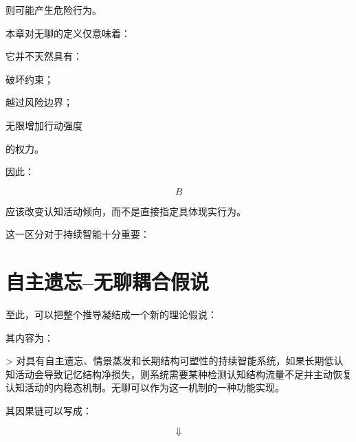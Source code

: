 则可能产生危险行为。

本章对无聊的定义仅意味着：

\begin{statementbox}
\centering
{}
\end{statementbox}

它并不天然具有：

破坏约束；

越过风险边界；

无限增加行动强度

的权力。

因此：

\[
B
\]

应该改变认知活动倾向，而不是直接指定具体现实行为。

这一区分对于持续智能十分重要：

\begin{statementbox}
\centering
{}
\end{statementbox}

\section{自主遗忘--无聊耦合假说}

至此，可以把整个推导凝结成一个新的理论假说：

\begin{statementbox}
\centering
{}
\end{statementbox}

其内容为：

> 对具有自主遗忘、情景蒸发和长期结构可塑性的持续智能系统，如果长期低认知活动会导致记忆结构净损失，则系统需要某种检测认知结构流量不足并主动恢复认知活动的内稳态机制。无聊可以作为这一机制的一种功能实现。

其因果链可以写成：

\begin{statementbox}
\centering
{}
\end{statementbox}

\[
\Downarrow
\]

\begin{statementbox}
\centering
{}
\end{statementbox}

